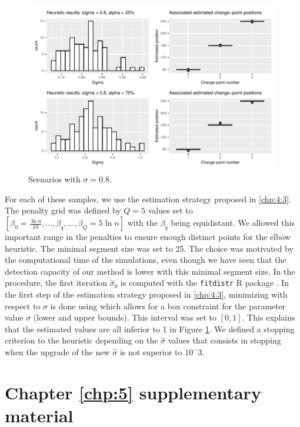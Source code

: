 \begin{appendices}
\begin{figure}[ht]
    \centering
    \includegraphics{figs/App/SIM_CHAP5_2.pdf}
    \caption{Scenarios with $\sigma = 0.8$.}
    \label{fig:sim:sigma2}
\end{figure}

For each of these samples, we use the estimation strategy proposed in \ref{chp:4:3}. The penalty grid was defined by $Q = 5$ values set to $[\beta_0 = \frac{\ln n}{10},\dots,\beta_{q},\dots,\beta_{Q} = 5\ln n]$ with the $\beta_q$ being equidistant. We allowed this important range in the penalties to ensure enough distinct points for the elbow heuristic. The minimal segment size was set to 25. The choice was motivated by the computational time of the simulations, even though we have seen that the detection capacity of our method is lower with this minimal segment size. In the procedure, the first iteration $\widehat{\sigma}_0$ is computed with the \texttt{fitdistr} R package \cite{delignette2015}. In the first step of the estimation strategy proposed in \ref{chp:4:3}, minimizing with respect to $\sigma$ is done using \cite{Byrd1995} which allows for a box constraint for the parameter value $\sigma$ (lower and upper bounds). This interval was set to $[0,1]$. This explains that the estimated values are all inferior to 1 in Figure \ref{fig:sim:sigma2}. We defined a stopping criterion to the heuristic depending on the $\widehat{\sigma}$ values that consists in stopping when the upgrade of the new $\widehat{\sigma}$ is not superior to $10^-3$.


\chapter{Chapter \ref{chp:5} supplementary material}\label{app:chap5}


\end{appendices}
